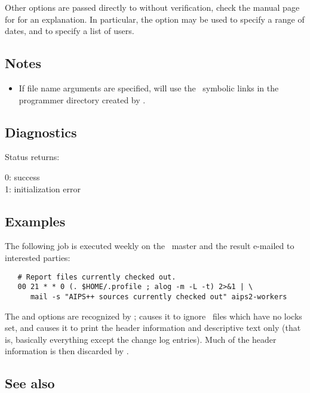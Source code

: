 Other options are passed directly to  without verification,
check the manual page for  for an explanation.  In particular,
the  option may be used to specify a range of dates, and  to
specify a list of users.

\subsection*{Notes}

\begin{itemize}
\item
   If file name arguments are specified,  will use the \rcs\ 
   symbolic links in the programmer directory created by .
\end{itemize}

\subsection*{Diagnostics}

Status returns:
\begin{status}
   0: success\\
   1: initialization error
\end{status}

\subsection*{Examples}

The following  job is executed weekly on the \aipspp\ master
and the result e-mailed to interested parties:

\begin{verbatim}
   # Report files currently checked out.
   00 21 * * 0 (. $HOME/.profile ; alog -m -L -t) 2>&1 | \
      mail -s "AIPS++ sources currently checked out" aips2-workers
\end{verbatim}

\noindent
The  and  options are recognized by ; 
causes it to ignore \rcs\ files which have no locks set, and  causes
it to print the header information and descriptive text only (that is,
basically everything except the change log entries).  Much of the header
information is then discarded by \exe{alog}.

\subsection*{See also}

